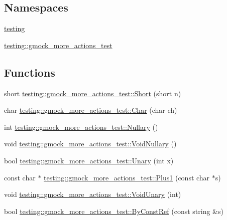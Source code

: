 \subsection*{Namespaces}
\begin{DoxyCompactItemize}
\item 
 \hyperlink{namespacetesting}{testing}
\item 
 \hyperlink{namespacetesting_1_1gmock__more__actions__test}{testing\+::gmock\+\_\+more\+\_\+actions\+\_\+test}
\end{DoxyCompactItemize}
\subsection*{Functions}
\begin{DoxyCompactItemize}
\item 
short \hyperlink{namespacetesting_1_1gmock__more__actions__test_a00503d3168f1123e314c0d42b7e10b88}{testing\+::gmock\+\_\+more\+\_\+actions\+\_\+test\+::\+Short} (short n)
\item 
char \hyperlink{namespacetesting_1_1gmock__more__actions__test_af69e6906d734a99d60480e4291891d66}{testing\+::gmock\+\_\+more\+\_\+actions\+\_\+test\+::\+Char} (char ch)
\item 
int \hyperlink{namespacetesting_1_1gmock__more__actions__test_acdd2dd80f777fdb770b513b63064ac19}{testing\+::gmock\+\_\+more\+\_\+actions\+\_\+test\+::\+Nullary} ()
\item 
void \hyperlink{namespacetesting_1_1gmock__more__actions__test_a061f6d66383a4e793b4d4ca93bd8ca2f}{testing\+::gmock\+\_\+more\+\_\+actions\+\_\+test\+::\+Void\+Nullary} ()
\item 
bool \hyperlink{namespacetesting_1_1gmock__more__actions__test_aad456ea2ee1b0cb2741b676a34f540a3}{testing\+::gmock\+\_\+more\+\_\+actions\+\_\+test\+::\+Unary} (int x)
\item 
const char $\ast$ \hyperlink{namespacetesting_1_1gmock__more__actions__test_a986ada18d3311d3fa3a7c33e54e18f33}{testing\+::gmock\+\_\+more\+\_\+actions\+\_\+test\+::\+Plus1} (const char $\ast$s)
\item 
void \hyperlink{namespacetesting_1_1gmock__more__actions__test_a163632ef644604032f00334fce36de1a}{testing\+::gmock\+\_\+more\+\_\+actions\+\_\+test\+::\+Void\+Unary} (int)
\item 
bool \hyperlink{namespacetesting_1_1gmock__more__actions__test_ab175725bcdacf7a00948c7d5c1a36419}{testing\+::gmock\+\_\+more\+\_\+actions\+\_\+test\+::\+By\+Const\+Ref} (const string \&s)
\item 

\end{DoxyCompactItemize}

